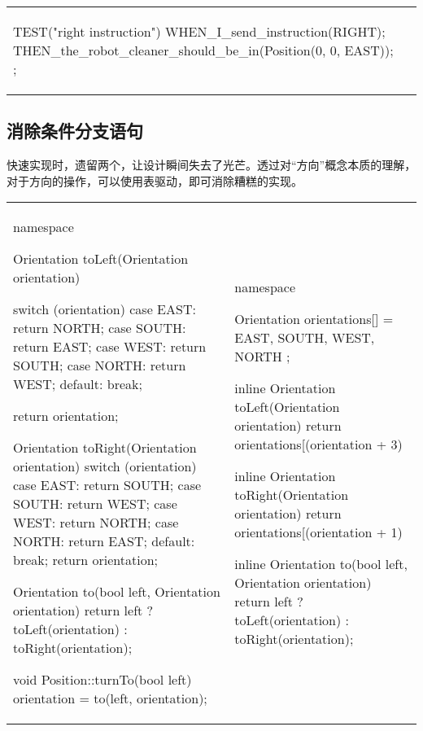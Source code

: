\begin{content}
\begin{tabular}{@{}p{} 
                 | p{}@{}}
\begin{c++}[caption={test/robot-cleaner/TestRobotCleaner.h}]
{    TEST("right instruction")
    {
        WHEN_I_send_instruction(RIGHT);
        THEN_the_robot_cleaner_should_be_in(Position(0, 0, EAST));
    }
};
\end{c++}
\end{tabular}

\subsection{消除条件分支语句}

快速实现时，遗留两个，让设计瞬间失去了光芒。透过对“方向”概念本质的理解，对于方向的操作，可以使用表驱动，即可消除糟糕的实现。

\begin{tabular}{@{}p{} 
                 | p{}@{}}
\begin{c++}[caption={src/robot-cleaner/Position.cpp}]
namespace
{
    Orientation toLeft(Orientation orientation)
    {
        switch (orientation)
        {
        case EAST:  return NORTH;
        case SOUTH: return EAST;
        case WEST:  return SOUTH;
        case NORTH: return WEST;
        default: break;
        }
        
        return orientation;
    }

    Orientation toRight(Orientation orientation)
    {
        switch (orientation)
        {
        case EAST:  return SOUTH;
        case SOUTH: return WEST;
        case WEST:  return NORTH;
        case NORTH: return EAST;
        default: break;
        }
        return orientation;
    }
    
    Orientation to(bool left, Orientation orientation)
    {
       return left ? toLeft(orientation) : toRight(orientation);
    }
}

void Position::turnTo(bool left)
{
    orientation = to(left, orientation);
}
\end{c++}
&
\begin{c++}[caption={src/robot-cleaner/Position.cpp}]
namespace
{
    Orientation orientations[] = { EAST, SOUTH, WEST, NORTH };

    inline Orientation toLeft(Orientation orientation)
    {
        return orientations[(orientation + 3) %
    }
    
    inline Orientation toRight(Orientation orientation)
    {
        return orientations[(orientation + 1) %
    }

    inline Orientation to(bool left, Orientation orientation)
    {
        return left ? toLeft(orientation) : toRight(orientation);
    }
}


\end{c++}
\end{tabular}
\end{content}

